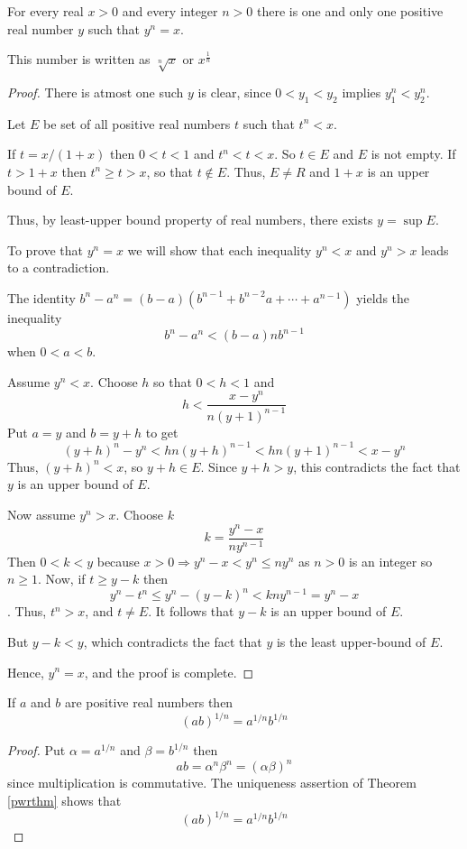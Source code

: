 \begin{thm}
	\label{pwrthm}
	For every real $x > 0$ and every integer $n > 0$ there is one and only one
	positive real number $y$ such that $y^n = x$.

	This number is written as $\sqrt[n]{x}$ or $x^{\frac{1}{n}}$
	\begin{proof}
		There is atmost one such $y$ is clear, since $0 < y_1 < y_2$ implies $y_1^n < y_2^n$.

		Let $E$ be set of all positive real numbers $t$ such that $t^n < x$.

		If $t = x / (1 + x)$ then $0 < t < 1$ and $t^n < t < x$. So $t \in E$ and $E$ is not empty.
		If $t > 1 + x$ then $t^n \geq t > x$, so that $t \notin E$.
		Thus, $E \neq R$ and $1 + x$ is an upper bound of $E$.

		Thus, by least-upper bound property of real numbers, there exists $y = \sup E$.

		To prove that $y^n = x$ we will show that each inequality $y^n < x$ and $y^n > x$ leads to a contradiction.

		The identity $b^n - a^n = (b - a)(b^{n-1} + b^{n-2}a + \cdots + a^{n-1} )$ yields the inequality
		$$ b^n - a^n < (b - a) n b^{n-1} $$
		when $0 < a < b$.

		Assume $y^n < x$. Choose $h$ so that $0 < h < 1$ and
		$$ h < \frac{x - y^n}{n(y+1)^{n-1}} $$
		Put $a = y$ and $b = y + h$ to get
		$$ (y + h)^n - y^n < hn(y+h)^{n-1} < hn(y+1)^{n-1} < x - y^n $$
		Thus, $(y + h)^n < x$, so $y + h \in E$.
		Since $y + h > y$, this contradicts the fact that $y$ is an upper bound of $E$.

		Now assume $y^n > x$. Choose $k$
		$$ k = \frac{y^n - x}{ny^{n-1}} $$
		Then $0 < k < y$ because $x > 0 \Rightarrow y^n - x < y^n \leq ny^n$ as $n > 0$ is an integer so $n \geq 1$.
		Now, if $t \geq y - k$ then
		$$ y^n - t^n \leq y^n - (y-k)^n < kny^{n-1} = y^n - x $$.
		Thus, $t^n > x$, and $t \neq E$. It follows that $y - k$ is an upper bound of $E$.

		But $y - k < y$, which contradicts the fact that $y$ is the least upper-bound of $E$.

		Hence, $y^n = x$, and the proof is complete.
	\end{proof}
\end{thm}

\begin{cor}
	If $a$ and $b$ are positive real numbers then $$(ab)^{1/n} = a^{1/n} b^{1/n}$$
	\begin{proof}
		Put $\alpha = a^{1/n}$ and $\beta = b^{1/n}$ then $$ ab = \alpha^n \beta^n = (\alpha \beta)^n $$
		since multiplication is commutative. The uniqueness assertion of Theorem \ref{pwrthm} shows that
		$$ (ab)^{1/n} = a^{1/n} b^{1/n} $$
	\end{proof}
\end{cor}

